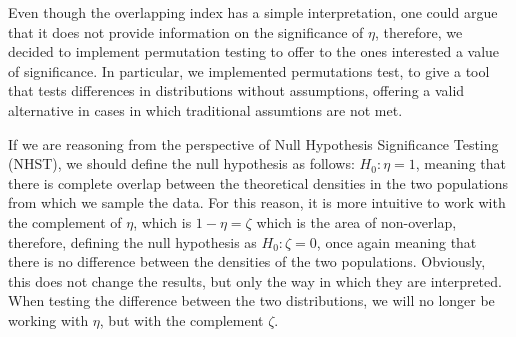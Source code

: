 \documentclass[twocolumn]{article}\usepackage[]{graphicx}\usepackage[]{xcolor}
\begin{document}
Even though the overlapping index has a simple interpretation, one could argue that it does not provide information on the significance of $\eta$, therefore, we decided to implement permutation testing to offer to the ones interested a value of significance. In particular, we implemented permutations test, to give a tool that tests differences in distributions without assumptions, offering a valid alternative in cases in which traditional assumtions are not met. 


If we are reasoning from the perspective of Null Hypothesis Significance Testing (NHST), we should define the null hypothesis as follows: $H_0: \eta = 1$,  meaning that there is complete overlap between the theoretical densities in the two populations from which we sample the data. For this reason, it is more intuitive to work with the complement of $\eta$, which is  $1-\eta = \zeta$ which is the area of non-overlap, therefore, defining the null hypothesis as  $H_0:\zeta = 0$, once again meaning that there is no difference between the densities of the two populations. Obviously, this does not change the results, but only the way in which they are interpreted. When testing the difference between the two distributions, we will no longer be working with $\eta$, but with the complement $\zeta$. 
\end{document}
